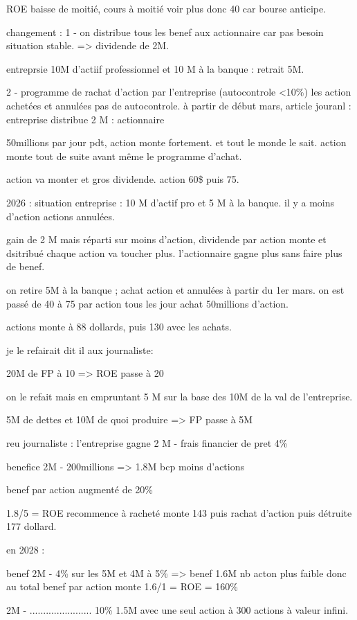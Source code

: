 \documentclass[a4paper,12pt]{article}
\begin{document}
ROE baisse de moitié, cours à moitié voir plus donc 40 car bourse anticipe.

changement : 1 - on distribue tous les benef aux actionnaire car pas besoin situation stable.
=> dividende de 2M.

entreprsie 10M d'actiif professionnel et 10 M à la banque : retrait 5M.

2 - programme de rachat d'action par l'entreprise  (autocontrole <10\%)
les action achetées et annulées pas de autocontrole. 
à partir de début mars, 
article jouranl : entreprise distribue 2 M : actionnaire 

50millions par jour pdt, action monte fortement. et tout le monde le sait.
action monte tout de suite avant même le programme d'achat.

action va monter et gros dividende.
action 60\$ puis 75.

2026 : situation entreprise : 10 M d'actif pro et 5 M à la banque.
il y a moins d'action actions annulées.

gain de 2 M mais réparti sur moins d'action, dividende par action monte et dsitribué
chaque action va toucher plus. l'actionnaire gagne plus sans faire plus de benef.

on retire 5M à la banque ; achat action et annulées à partir du 1er mars.
on est passé de 40 à 75 par action tous les jour achat 50millions d'action.

actions monte à 88 dollards, puis 130 avec les achats.

je le refairait dit il aux journaliste:

20M de FP à 10 => ROE passe à 20

on le refait mais en empruntant 5 M sur la base des 10M de la val de l'entreprise.

5M de dettes et 10M de quoi produire => FP passe à 5M

reu journaliste : l'entreprise gagne 2 M - frais financier de pret 4\%


benefice 2M - 200millions => 1.8M  bcp moins d'actions

benef par action augmenté de 20\%

1.8/5 = ROE
recommence à racheté monte 143 puis rachat d'action puis détruite 177 dollard.


en 2028 : 

benef 2M - 4\% sur les 5M et 4M à 5\%  => benef 1.6M nb acton plus faible donc au total
benef par action monte  
1.6/1 = ROE = 160\%
   
2M - ....................... 10\%     1.5M avec une seul action à 300 actions à valeur infini.
\end{document}
